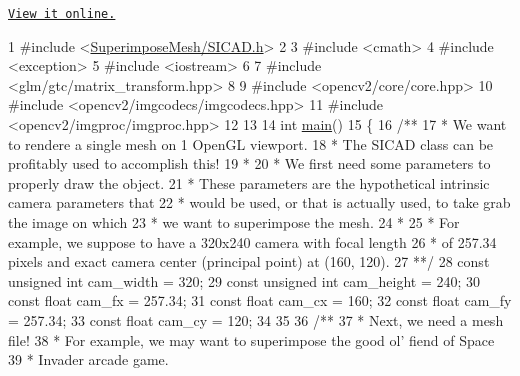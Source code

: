 \href{https://github.com/robotology/superimpose-mesh-lib/blob/master/doc/tutorial_code/tutorial_superimpose_customshader.cpp}{\tt View it online.} 
\begin{DoxyCodeInclude}
1 \textcolor{preprocessor}{#include <\mbox{\hyperlink{SICAD_8h}{SuperimposeMesh/SICAD.h}}>}
2 
3 \textcolor{preprocessor}{#include <cmath>}
4 \textcolor{preprocessor}{#include <exception>}
5 \textcolor{preprocessor}{#include <iostream>}
6 
7 \textcolor{preprocessor}{#include <glm/gtc/matrix\_transform.hpp>}
8 
9 \textcolor{preprocessor}{#include <opencv2/core/core.hpp>}
10 \textcolor{preprocessor}{#include <opencv2/imgcodecs/imgcodecs.hpp>}
11 \textcolor{preprocessor}{#include <opencv2/imgproc/imgproc.hpp>}
12 
13 
14 \textcolor{keywordtype}{int} \mbox{\hyperlink{tutorial__superimpose__customshader_8cpp_ae66f6b31b5ad750f1fe042a706a4e3d4}{main}}()
15 \{\textcolor{comment}{}
16 \textcolor{comment}{    /**}
17 \textcolor{comment}{     * We want to rendere a single mesh on 1 OpenGL viewport.}
18 \textcolor{comment}{     * The SICAD class can be profitably used to accomplish this!}
19 \textcolor{comment}{     *}
20 \textcolor{comment}{     * We first need some parameters to properly draw the object.}
21 \textcolor{comment}{     * These parameters are the hypothetical intrinsic camera parameters that}
22 \textcolor{comment}{     * would be used, or that is actually used, to take grab the image on which}
23 \textcolor{comment}{     * we want to superimpose the mesh.}
24 \textcolor{comment}{     *}
25 \textcolor{comment}{     * For example, we suppose to have a 320x240 camera with focal length}
26 \textcolor{comment}{     * of 257.34 pixels and exact camera center (principal point) at (160, 120).}
27 \textcolor{comment}{     **/}
28     \textcolor{keyword}{const} \textcolor{keywordtype}{unsigned} \textcolor{keywordtype}{int} cam\_width  = 320;
29     \textcolor{keyword}{const} \textcolor{keywordtype}{unsigned} \textcolor{keywordtype}{int} cam\_height = 240;
30     \textcolor{keyword}{const} \textcolor{keywordtype}{float}        cam\_fx     = 257.34;
31     \textcolor{keyword}{const} \textcolor{keywordtype}{float}        cam\_cx     = 160;
32     \textcolor{keyword}{const} \textcolor{keywordtype}{float}        cam\_fy     = 257.34;
33     \textcolor{keyword}{const} \textcolor{keywordtype}{float}        cam\_cy     = 120;
34 
35 \textcolor{comment}{}
36 \textcolor{comment}{    /**}
37 \textcolor{comment}{     * Next, we need a mesh file!}
38 \textcolor{comment}{     * For example, we may want to superimpose the good ol' fiend of Space}
39 \textcolor{comment}{     * Invader arcade game.}

\end{DoxyCodeInclude}
